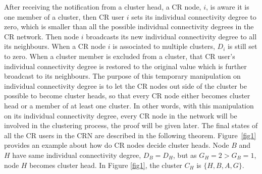 After receiving the notification from a cluster head, a CR node, \eg $i$, is aware it is one member of a cluster, then CR user $i$ sets its individual connectivity degree to zero, which is smaller than all the possible individual connectivity degrees in the CR network.
Then node $i$ broadcasts its new individual connectivity degree to all its neighbours. 
When a CR node $i$ is associated to multiple clusters, $D_i$ is still set to zero. %
When a cluster member is excluded from a cluster, that CR user's individual connectivity degree is restored to the original value which is further broadcast to its neighbours.
The purpose of this temporary manipulation on individual connectivity degree is to let the CR nodes out side of the cluster be possible to become cluster heads, so that every CR node either becomes cluster head or a member of at least one cluster.
In other words, with this manipulation on its individual connectivity degree, every CR node in the network will be involved in the clustering process, the proof will be given later.
The final states of all the CR users in the CRN are described in the following theorem.
Figure~\ref{fig1} provides an example about how do CR nodes decide cluster heads.
Node $B$ and $H$ have same individual connectivity degree, $D_B=D_H$, but as $G_H=2>G_B=1$, node $H$ becomes cluster head.
In Figure \ref{fig1}, the cluster $C_H$ is $\{H, B, A, G\}$.

